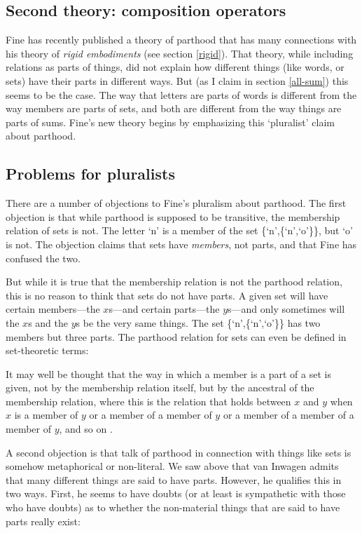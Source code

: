 \documentclass[11pt]{article}
\newenvironment{squote}{%
\begin{spacing}{1}
\begin{list}{}{%
\setlength{\labelwidth}{0pt}%
\rightmargin\leftmargin%
}
\item\relax
}{%
\end{list}%
\end{spacing}
}
\begin{document}
\begin{spacing}{1.5}
\section{Second theory: composition operators}
\label{fine-c}
Fine has recently published a theory of parthood that has many
connections with his theory of {\em rigid embodiments} (see section
\ref{rigid}).  That theory, while including relations as parts of
things, did not explain how different things (like words, or sets)
have their parts in different ways.  But (as I claim in section
\ref{all-sum}) this seems to be the case.  The way that letters are
parts of words is different from the way members are parts of sets,
and both are different from the way things are parts of sums.  Fine's
new theory begins by emphasizing this `pluralist' claim about
parthood.

\subsection{Problems for pluralists}
\label{sets}
There are a number of objections to Fine's pluralism about parthood.
The first objection is that while parthood is supposed to be
transitive, the membership relation of sets is not.  The letter `n' is
a member of the set \{`n',\{`n',`o'\}\}, but `o' is not.  The
objection claims that sets have {\em members}, not parts, and that
Fine has confused the two.

But while it is true that the membership relation is not the parthood
relation, this is no reason to think that sets do not have parts.  A
given set will have certain members---the $x$s---and certain
parts---the $y$s---and only sometimes will the $x$s and the $y$s be
the very same things.  The set \{`n',\{`n',`o'\}\} has two members
but three parts.  The parthood relation for sets can even be defined
in set-theoretic terms:

\begin{squote}
It may well be thought that the way in which a member is a part of a
set is given, not by the membership relation itself, but by the
ancestral of the membership relation, where this is the relation that
holds between $x$ and $y$ when $x$ is a member of $y$ or a member of a
member of $y$ or a member of a member of a member of $y$, and so on
\citep[563]{fine2010}.
\end{squote}

A second objection is that talk of parthood in connection with things
like sets is somehow metaphorical or non-literal.  We saw above that
van Inwagen admits that many different things are said to have parts.
However, he qualifies this in two ways.  First, he seems to have
doubts (or at least is sympathetic with those who have doubts) as to
whether the non-material things that are said to have parts really
exist:


\end{spacing}
\end{document}
